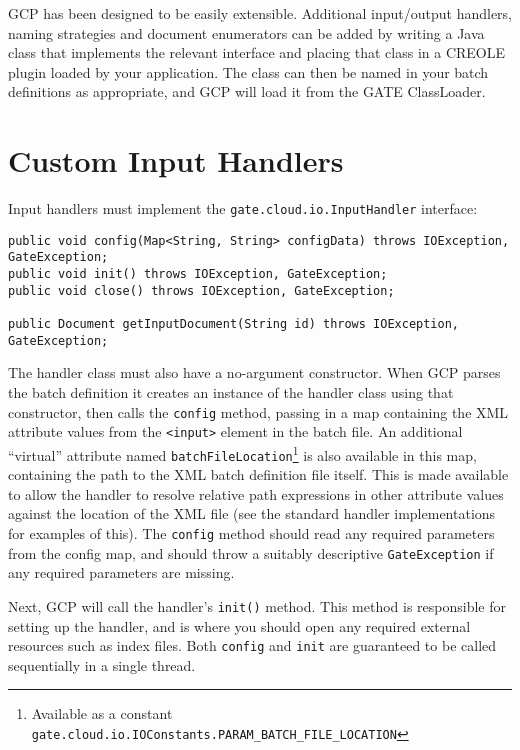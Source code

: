 GCP has been designed to be easily extensible.  Additional input/output
handlers, naming strategies and document enumerators can be added by writing a
Java class that implements the relevant interface and placing that class in a
CREOLE plugin loaded by your application.  The class can then be named in your
batch definitions as appropriate, and GCP will load it from the GATE
ClassLoader.

\section{Custom Input Handlers}\label{sec:extending:input}

Input handlers must implement the \verb!gate.cloud.io.InputHandler! interface:

\begin{lstlisting}[breaklines]
public void config(Map<String, String> configData) throws IOException, GateException;
public void init() throws IOException, GateException;
public void close() throws IOException, GateException;

public Document getInputDocument(String id) throws IOException, GateException;
\end{lstlisting}

The handler class must also have a no-argument constructor.  When GCP parses
the batch definition it creates an instance of the handler class using that
constructor, then calls the \verb!config! method, passing in a map containing
the XML attribute values from the \verb!<input>! element in the batch file.  An
additional ``virtual'' attribute named
\verb!batchFileLocation!\footnote{Available as a constant
{\tt gate.cloud.io.IOConstants.PARAM\_BATCH\_FILE\_LOCATION}} is also available
in this map, containing the path to the XML batch definition file itself.  This
is made available to allow the handler to resolve relative path expressions in
other attribute values against the location of the XML file (see the standard
handler implementations for examples of this).  The \verb!config! method should
read any required parameters from the config map, and should throw a suitably
descriptive \verb!GateException! if any required parameters are missing.

Next, GCP will call the handler's \verb!init()! method.  This method is
responsible for setting up the handler, and is where you should open any
required external resources such as index files.  Both \verb!config! and
\verb!init! are guaranteed to be called sequentially in a single thread.

